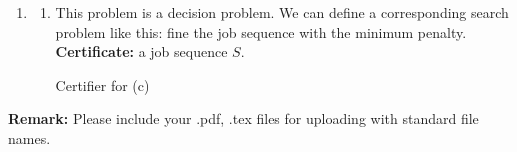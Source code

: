 \documentclass[12pt,a4paper]{article}
\makeatletter
\newtheorem*{solution}{Solution}
\theoremstyle{definition}
\renewenvironment{solution}[1][Solution] {\par\pushQED{\qed}\normalfont\topsep6\p@\@plus6\p@\relax\trivlist\item[\hskip\labelsep\bfseries#1\@addpunct{.}]\ignorespaces}{\popQED\endtrivlist\@endpefalse} \makeatother
\makeatother
\begin{document}
\begin{enumerate}
\begin{solution}
\begin{enumerate}
	     \begin{minipage}[t]{0.85\textwidth}         \begin{algorithm}[H]          	    
	          	    \BlankLine          	    
	     \caption{Certifier for (b)} 	    
	     \label{Alg-certifier-b} 
	     \end{algorithm}          	    
	     \end{minipage}
	    \item
	    This problem is a decision problem. We can define a corresponding search problem like this: fine the job sequence with the minimum penalty.\\
	    \textbf{Certificate:} a job sequence $S$.
	    
	      \begin{minipage}[t]{0.85\textwidth}         \begin{algorithm}[H]          	     	     
	                	     	          	    \BlankLine          	     	     
	      \caption{Certifier for (c)} 	     	     \label{Alg-certifier-c} 	    	     	     
	      \end{algorithm}          	     	     
	      \end{minipage}
	\end{enumerate}
	\end{solution}
\end{enumerate}

\textbf{Remark:} Please include your .pdf, .tex files for uploading with standard file names.
\newpage


\end{document}
